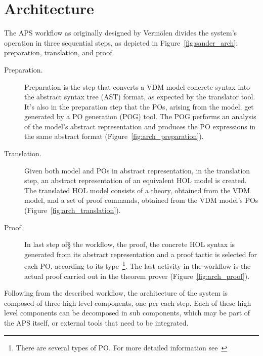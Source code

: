 \documentclass[]{article}
\begin{document}
\section{Architecture}
\label{sec:intended_architecure}

%
%

The APS workflow as originally designed by Verm\"olen divides the system's operation in three sequential steps, as depicted in Figure~\ref{fig:sander_arch}: preparation, translation, and proof.

\begin{description}
  \item[Preparation.] Preparation is the step that converts a VDM model concrete syntax into the abstract syntax tree (AST) format, as expected by the translator tool.
	It's also in the preparation step that the POs, arising from the model, get generated by a PO generation (POG) tool.
	The POG performs an analysis of the model's abstract representation and produces the PO expressions in the same abstract format (Figure~\ref{fig:arch_preparation}).

  \item[Translation.] Given both model and POs in abstract representation, in the translation step, an abstract representation of an equivalent HOL model is created. 
	The translated HOL model consists of a theory, obtained from the VDM model, and a set of proof commands, obtained from the VDM model's POs (Figure~\ref{fig:arch_translation}).

  \item[Proof.] In last step of§ the workflow, the proof, the concrete HOL syntax is generated from its abstract representation and a proof tactic is selected for each PO, according to its type~\footnote{There are several types of PO. For more detailed information see~\cite{CSK:2007lr}}. The last activity in the workflow is the actual proof carried out in the theorem prover (Figure~\ref{fig:arch_proof}).
\end{description}

Following from the described workflow, the architecture of the system is composed of three high level components, one per each step.
Each of these high level components can be decomposed in sub components, which may be part of the APS itself, or external tools that need to be integrated.
\end{document}
